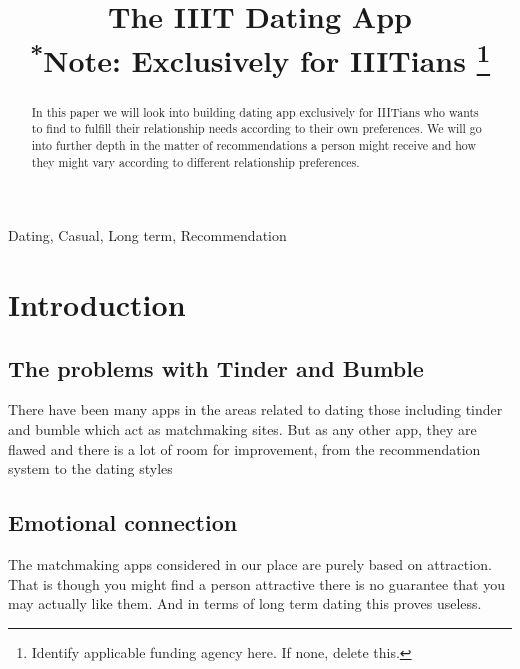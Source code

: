 \documentclass[conference]{IEEEtran}
\begin{document}
\title{The IIIT Dating App\\
{\footnotesize \textsuperscript{*}Note: Exclusively for IIITians}
\thanks{Identify applicable funding agency here. If none, delete this.}
}

\author{
}

\maketitle

\begin{abstract}
In this paper we will look into building  dating app exclusively for IIITians who wants to find to fulfill their relationship needs according to their own preferences. We will go into further depth in the matter of recommendations a person might receive and how they might vary according to different relationship preferences.
\end{abstract}

\begin{IEEEkeywords}
Dating, Casual, Long term, Recommendation
\end{IEEEkeywords}

\section{Introduction}
\subsection{The problems with Tinder and Bumble}
There have been many apps in the areas related to dating those including tinder and bumble which act as matchmaking sites. But as any other app, they are flawed and there is a lot of room for improvement, from the recommendation system to the dating styles
\subsection{Emotional connection}
The matchmaking apps considered in our place are purely based on attraction. That is though you might find a person attractive there is no guarantee that you may actually like them. And in terms of long term dating this proves useless. 
\end{document}
